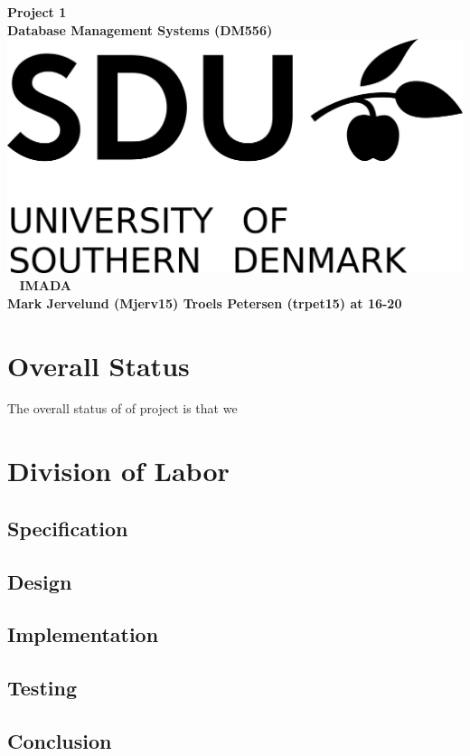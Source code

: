 \documentclass[a4paper,10pt,titlepage]{report}
\date{}
\begin{document}
\begin{titlepage}
\centering
    \vspace*{9\baselineskip}
    \huge
    \bfseries
    Project 1\\
    
    \normalfont 
	\huge    
    Database Management Systems (DM556)  \\[4\baselineskip]
    \normalfont
	\includegraphics[scale=1.5]{SDU_Logo}
    \vfill\ 
    \vspace{5mm}
    IMADA \\
Mark Jervelund (Mjerv15) Troels Petersen (trpet15)
    \textbf{\datedate}  \bf{at 16-20} \\[2\baselineskip]
\end{titlepage}

\setcounter{page}{1}
\renewcommand{\thepage}{\arabic{page}}

\lstset{language=Java}          %
\section{Overall Status}
The overall status of of project is that we 
\section{Division of Labor}
\subsection{Specification}


\subsection{Design}

 

\subsection{Implementation}

\subsection{Testing}

\subsection{Conclusion}
\end{document}
